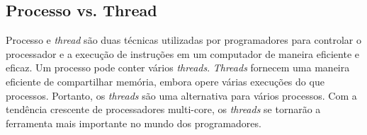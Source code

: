 \subsection{Processo vs. Thread}

Processo e \textit{thread} são duas técnicas utilizadas por programadores para controlar o processador e a execução de instruções em um computador de maneira eficiente e eficaz. Um processo pode conter vários \textit{threads}. \textit{Threads} fornecem uma maneira eficiente de compartilhar memória, embora opere várias execuções do que processos. Portanto, os \textit{threads} são uma alternativa para vários processos. Com a tendência crescente de processadores multi-core, os \textit{threads} se tornarão a ferramenta mais importante no mundo dos programadores.


\nocite{processo}